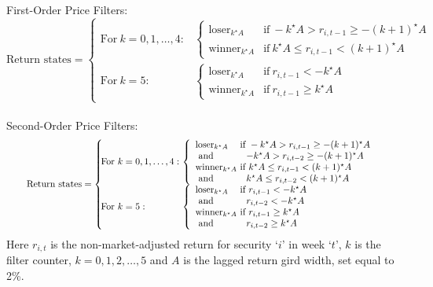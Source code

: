 \noindent First-Order Price Filters: \\ 
\begin{equation*}\label{eqn:firstorder} 
	\textrm{Return states} = \left\{ 
		\begin{array}{ll}
	\!\!\!\!\textrm{For} ~k = 0,1,\ldots,4:& \!\!\!\! \left\{ 
		\begin{array}{ll}\textrm{loser}_{k^\star A} & \!\!\!\! \textrm{if}~ -k^\star A>r_{i,t-1}\geq - (k+1)^\star A \\
		 \textrm{winner}_{k^\star A}&\!\!\!\!\textrm{if}~ k^\star A\leq r_{i,t-1} <  (k+1)^\star A
		 \end{array} \right.\\
	\!\!\!\!\textrm{For}~ k = 5:& \!\!\!\!\left\{ 
		 \begin{array}{ll}\textrm{loser}_{k^\star A} & \!\!\!\!\textrm{if}~ r_{i,t-1} <-k^\star A \\ 
		 \textrm{winner}_{k^\star A} & \!\!\!\!\textrm{if}~  r_{i,t-1} \geq  k^\star A
		 \end{array}\right.
		\end{array} 
		\right. 
	\end{equation*} \\ 
\noindent Second-Order Price Filters: \\ 
	\begin{equation}\label{eqn:secondorder} 
\scalebox{0.85}{$
	\textrm{Return states} =\left\{ 
		\begin{array}{ll}
		\!\!\!\!\textrm{For} ~k = 0,1,\ldots,4: & \!\!\!\! \left\{ 
			\begin{array}{ll}
			\textrm{loser}_{k^\star A} & \!\!\!\!\textrm{if}~ -k^\star A>r_{i,t-1}\geq - (k+1)^\star A \\ 
			\textrm{     and} & -k^\star A > r_{i,t-2} \geq -(k+1)^\star A \\
			\textrm{winner}_{k^\star A} & \!\!\!\!\textrm{if} ~k^\star A\leq r_{i,t-1} <  (k+1)^\star A \\ 
			\textrm{     and} & k^\star A \leq r_{i,t-2} < (k+1)^\star A
			\end{array}\right.\\
		\!\!\!\!\textrm{For} ~k = 5:& \!\!\!\!\left\{ 
		\begin{array}{ll}
		\textrm{loser}_{k^\star A} & \!\!\!\!\textrm{if}~ r_{i,t-1} <-k^\star A \\ 
		\textrm{     and}  & r_{i,t-2} <-k^\star A \\
		\textrm{winner}_{k^\star A} & \!\!\!\!\textrm{if}~  r_{i,t-1} \geq  k^\star A \\ 
		\textrm{     and} & r_{i,t-2} \geq k^\star A 
		\end{array}\right.
\end{array} \right. $}
	\end{equation} 
Here $r_{i,t}$ is the non-market-adjusted return for security `$i$' in week `$t$',  $k$ is the filter counter, $k=0,1,2,\ldots,5$ and $A$ is the lagged return gird width,  set equal to 2\%. 


